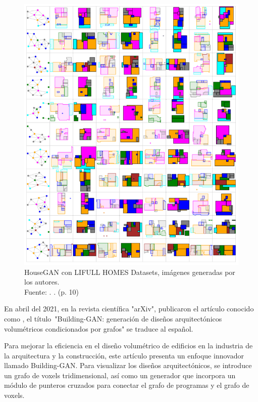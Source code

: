 \begin{figure}[!ht]
	\begin{center}
		\includegraphics[width=1\textwidth]{2/figures/ozerol2023.png}
		\caption[HouseGAN con LIFULL HOMES Datasets, imágenes generadas por los autores]{HouseGAN con LIFULL HOMES Datasets, imágenes generadas por los autores.\\
		Fuente: \cite{pr_ozerol2023genermass}. . (p. 10)}
		\label{2:fig120}
	\end{center}
\end{figure}

En abril del 2021, en la revista científica "arXiv", \cite{pr_chang2021buildinggan} publicaron el artículo conocido como , el título "Building-GAN: generación de diseños arquitectónicos volumétricos condicionados por grafos" se traduce al español.

Para mejorar la eficiencia en el diseño volumétrico de edificios en la industria de la arquitectura y la construcción, este artículo presenta un enfoque innovador llamado Building-GAN. Para visualizar los diseños arquitectónicos, se introduce un grafo de voxels tridimensional, así como un generador que incorpora un módulo de punteros cruzados para conectar el grafo de programas y el grafo de voxels.

